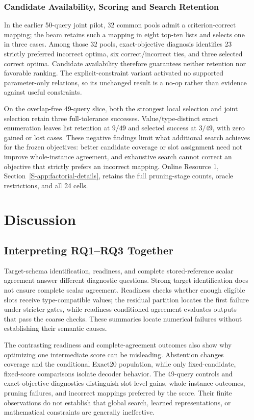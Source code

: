 \documentclass[pdflatex,iicol,sn-basic,Numbered]{sn-jnl}
\begin{document}
\subsubsection{Candidate Availability, Scoring and Search Retention}
In the earlier 50-query joint pilot, 32 common pools admit a criterion-correct mapping; the beam retains such a mapping in eight top-ten lists and selects one in three cases. Among those 32 pools, exact-objective diagnosis identifies 23 strictly preferred incorrect optima, six correct/incorrect ties, and three selected correct optima. Candidate availability therefore guarantees neither retention nor favorable ranking. The explicit-constraint variant activated no supported parameter-only relations, so its unchanged result is a no-op rather than evidence against useful constraints.

On the overlap-free 49-query slice, both the strongest local selection and joint selection retain three full-tolerance successes. Value/type-distinct exact enumeration leaves list retention at $9/49$ and selected success at $3/49$, with zero gained or lost cases. These negative findings limit what additional search achieves for the frozen objectives: better candidate coverage or slot assignment need not improve whole-instance agreement, and exhaustive search cannot correct an objective that strictly prefers an incorrect mapping. Online Resource 1, Section~\ref{S-app:factorial-details}, retains the full pruning-stage counts, oracle restrictions, and all 24 cells.

\section{Discussion}
\label{sec:discussion}
\subsection{Interpreting RQ1--RQ3 Together}
Target-schema identification, readiness, and complete stored-reference scalar agreement answer different diagnostic questions. Strong target identification does not ensure complete scalar agreement. Readiness checks whether enough eligible slots receive type-compatible values; the residual partition locates the first failure under stricter gates, while readiness-conditioned agreement evaluates outputs that pass the coarse checks. These summaries locate numerical failures without establishing their semantic causes.

The contrasting readiness and complete-agreement outcomes also show why optimizing one intermediate score can be misleading. Abstention changes coverage and the conditional Exact20 population, while only fixed-candidate, fixed-score comparisons isolate decoder behavior. The 49-query controls and exact-objective diagnostics distinguish slot-level gains, whole-instance outcomes, pruning failures, and incorrect mappings preferred by the score. Their finite observations do not establish that global search, learned representations, or mathematical constraints are generally ineffective.
\end{document}
